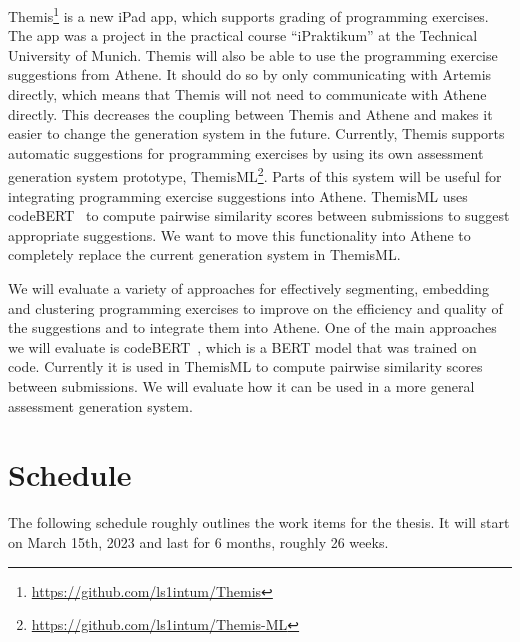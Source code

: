 Themis\footnote{\url{https://github.com/ls1intum/Themis}} is a new iPad app, which supports grading of programming exercises. The app was a project in the practical course \enquote{iPraktikum} at the Technical University of Munich.
Themis will also be able to use the programming exercise suggestions from Athene. It should do so by only communicating with Artemis directly, which means that Themis will not need to communicate with Athene directly. This decreases the coupling between Themis and Athene and makes it easier to change the generation system in the future.
%
Currently, Themis supports automatic suggestions for programming exercises by using its own assessment generation system prototype, ThemisML\footnote{\url{https://github.com/ls1intum/Themis-ML}}.
Parts of this system will be useful for integrating programming exercise suggestions into Athene. ThemisML uses codeBERT~\cite{codeBERT} to compute pairwise similarity scores between submissions to suggest appropriate suggestions. We want to move this functionality into Athene to completely replace the current generation system in ThemisML.

We will evaluate a variety of approaches for effectively segmenting, embedding and clustering programming exercises to improve on the efficiency and quality of the suggestions and to integrate them into Athene.
One of the main approaches we will evaluate is codeBERT~\cite{codeBERT}, which is a BERT model that was trained on code. Currently it is used in ThemisML to compute pairwise similarity scores between submissions. We will evaluate how it can be used in a more general assessment generation system.


\section{Schedule}

The following schedule roughly outlines the work items for the thesis. It will start on March 15th, 2023 and last for 6 months, roughly 26 weeks.

